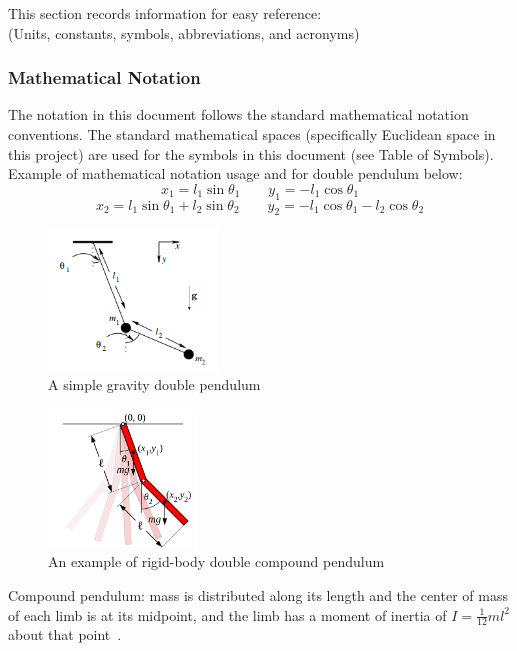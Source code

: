 \documentclass[12pt]{article}
\begin{document}
This section records information for easy reference: \\
(Units, constants, symbols, abbreviations, and acronyms)

\subsubsection{Mathematical Notation}

The notation in this document follows the standard mathematical notation
conventions.
The standard mathematical spaces (specifically Euclidean space in this project)
are used for the symbols in this document (see Table of Symbols).
Example of mathematical notation usage and for double pendulum below:
$$x_1 = l_1 \sin\theta_1 \quad\quad y_1 = -l_1 \cos\theta_1$$
$$x_2 = l_1 \sin\theta_1 + l_2 \sin\theta_2 \quad\quad y_2 = -l_1\cos\theta_1
-l_2\cos\theta_2$$

\begin{figure}[!htb]
	\centering
	\includegraphics[width=170px]{doublepend.PNG}
\caption{A simple gravity double pendulum~\citep{SzuminskiOlsztyn2012}}
	\label{fig:doublepend}
\end{figure}

\begin{figure}[!htb]
	\centering
	\includegraphics[width=150px]{Double-pendulum-rigid.png}
	\caption{An example of rigid-body double compound 
	pendulum~\citep{DoublePendulum}}
	\label{fig:multipend}
\end{figure}

Compound pendulum: mass is distributed along its length and the center 
of mass of each limb is at its midpoint, and the limb has a moment of inertia 
of $I = \frac{1}{12}ml^2$ about that point~\cite{DoublePendulum}.
\newpage
\end{document}
